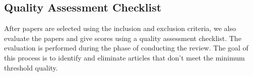 % 
\subsection{Quality Assessment Checklist}
After papers are selected using the inclusion and exclusion criteria, we also evaluate the papers and give scores using a quality assessment checklist. The evaluation  is performed during the phase of conducting the review. The goal of this process is to identify and eliminate articles that don't meet the minimum threshold quality. 


